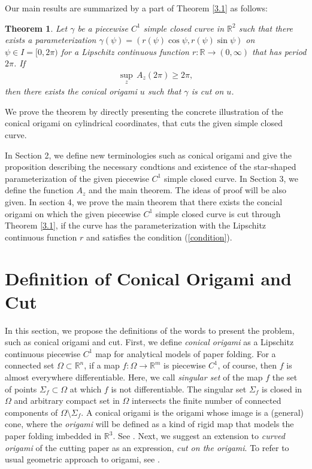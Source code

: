 \documentclass{amsart}
\theoremstyle{plain}
\newtheorem*{theorem*}{Theorem}
\theoremstyle{definition}
\theoremstyle{remark}
\begin{document}
Our main results are summarized by a part of Theorem \ref{3.1} as follows:
\begin{theorem*} %
Let $\gamma$ be a piecewise $C^1$ simple closed curve in $\mathbb{R}^2$ such that there exists a parameterization $\gamma(\psi)=(r(\psi)\cos\psi,r(\psi)\sin\psi)$ on $\psi\in I=[0,2\pi)$ for a Lipschitz continuous function $r:\mathbb{R}\to(0,\infty)$ that has period $2\pi$. If
\begin{align}\label{condition}%
\sup_{z}\,A_z(2\pi)\ge2\pi,
\end{align}
then there exists the conical origami $u$ such that $\gamma$ is cut on $u$.
\end{theorem*}
\noindent We prove the theorem by directly presenting the concrete illustration of the conical origami on cylindrical coordinates, that cuts the given simple closed curve.

In Section 2, we define new terminologies such as conical origami and give the proposition describing the necessary condtions and existence of the star-shaped parameterization of the given piecewise $C^1$ simple closed curve.
In Section 3, we define the function $A_z$ and the main theorem.
The ideas of proof will be also given.
In section 4, we prove the main theorem that there exists the concial origami on which the given piecewise $C^1$ simple closed curve is cut through Theorem \ref{3.1}, if the curve has the parameterization with the Lipschitz continuous function $r$ and satisfies the condition (\ref{condition}).






\bigskip

\section{Definition of Conical Origami and Cut}%

In this section, we propose the definitions of the words to present the problem, such as conical origami and cut.
First, we define \emph{conical origami} as a Lipschitz continuous piecewise $C^1$ map for analytical models of paper folding.
For a connected set $\Omega\subset\mathbb{R}^n$, if a map $f:\Omega\to\mathbb{R}^m$ is piecewise $C^1$, of course, then $f$ is almost everywhere differentiable.
Here, we call \emph{singular set} of the map $f$ the set of points $\Sigma_f\subset\Omega$ at which $f$ is not differentiable.
The singular set $\Sigma_f$ is closed in $\Omega$ and arbitrary compact set in $\Omega$ intersects the finite number of connected components of $\Omega\setminus\Sigma_f$.
A conical origami is the origami whose image is a (general) cone, where the \emph{origami} will be defined as a kind of rigid map that models the paper folding imbedded in $\mathbb{R}^3$.
See \cite{dacorogna2008lipschitz}.
Next, we suggest an extension to \emph{curved origami} of the cutting paper as an expression, \emph{cut on the origami}.
To refer to usual geometric approach to origami, see \cite{arkin2004can,hull1994mathematics,kawasaki1989relation,lang1996computational}.
\end{document}
